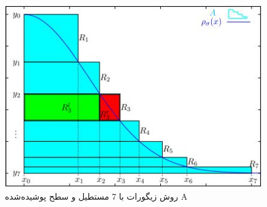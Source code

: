     \begin{figure}[!htb]
      	\includegraphics[width=\linewidth]{images/Ziggurate-intro}
      	\caption{روش زیگورات با 7 مستطیل و سطح پوشیده‌شده A}\label{fig:logtonemap}
      	\endminipage\hfill

      \end{figure}

